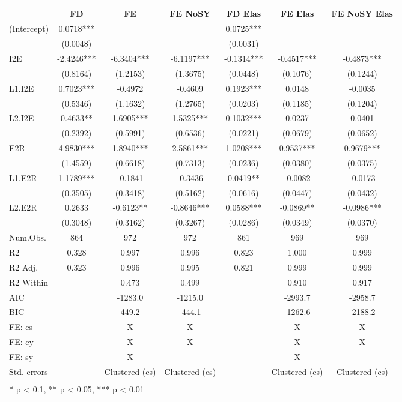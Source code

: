 \begin{table}[H]
\centering
\begin{tabular}[t]{lcccccc}
\toprule
  & FD & FE & FE NoSY & FD Elas & FE Elas & FE NoSY Elas\\
\midrule
(Intercept) & 0.0718*** &  &  & 0.0725*** &  & \\
 & (0.0048) &  &  & (0.0031) &  & \\
I2E & -2.4246*** & -6.3404*** & -6.1197*** & -0.1314*** & -0.4517*** & -0.4873***\\
 & (0.8164) & (1.2153) & (1.3675) & (0.0448) & (0.1076) & (0.1244)\\
L1.I2E & 0.7023*** & -0.4972 & -0.4609 & 0.1923*** & 0.0148 & -0.0035\\
 & (0.5346) & (1.1632) & (1.2765) & (0.0203) & (0.1185) & (0.1204)\\
L2.I2E & 0.4633** & 1.6905*** & 1.5325*** & 0.1032*** & 0.0237 & 0.0401\\
 & (0.2392) & (0.5991) & (0.6536) & (0.0221) & (0.0679) & (0.0652)\\
E2R & 4.9830*** & 1.8940*** & 2.5861*** & 1.0208*** & 0.9537*** & 0.9679***\\
 & (1.4559) & (0.6618) & (0.7313) & (0.0236) & (0.0380) & (0.0375)\\
L1.E2R & 1.1789*** & -0.1841 & -0.3436 & 0.0419** & -0.0082 & -0.0173\\
 & (0.3505) & (0.3418) & (0.5162) & (0.0616) & (0.0447) & (0.0432)\\
L2.E2R & 0.2633 & -0.6123** & -0.8646*** & 0.0588*** & -0.0869** & -0.0986***\\
 & (0.3048) & (0.3162) & (0.3267) & (0.0286) & (0.0349) & (0.0370)\\
\midrule
Num.Obs. & 864 & 972 & 972 & 861 & 969 & 969\\
R2 & 0.328 & 0.997 & 0.996 & 0.823 & 1.000 & 0.999\\
R2 Adj. & 0.323 & 0.996 & 0.995 & 0.821 & 0.999 & 0.999\\
R2 Within &  & 0.473 & 0.499 &  & 0.910 & 0.917\\
AIC &  & -1283.0 & -1215.0 &  & -2993.7 & -2958.7\\
BIC &  & 449.2 & -444.1 &  & -1262.6 & -2188.2\\
FE: cs &  & X & X &  & X & X\\
FE: cy &  & X & X &  & X & X\\
FE: sy &  & X &  &  & X & \\
Std. errors &  & Clustered (cs) & Clustered (cs) &  & Clustered (cs) & Clustered (cs)\\
\bottomrule
\multicolumn{7}{l}{\textsuperscript{} * p < 0.1, ** p < 0.05, *** p < 0.01}\\
\end{tabular}
\end{table}
